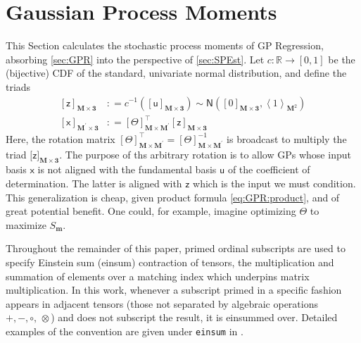 \documentclass[preprint,12pt]{elsarticle}
\newcommand*{\M}[1]{\ensuremath{#1}\xspace}
\newcommand*{\x}{\times}
\newcommand*{\mi}[1]{\mathbf{#1}}
\newcommand*{\st}[1]{\mathbb{#1}}
\newcommand*{\rv}[1]{\mathsf{#1}}
\newcommand*{\te}[2][]{\left\lbrack{#2}\right\rbrack_{#1}}
\newcommand*{\tte}[2][]{\lbrack{#2}\rbrack_{#1}}
\newcommand*{\diag}[2][]{\left\langle{#2}\right\rangle_{#1}}
\newcommand*{\deq}{\M{\mathrel{\mathop:}=}}
\newcommand*{\gauss}[2]{\mathsf{N}\!\left({#1,#2}\right)}
\begin{document}
\section{Gaussian Process Moments}\label{sec:GPMom}
    This Section calculates the stochastic process moments of GP Regression, absorbing \cref{sec:GPR} into the perspective of \cref{sec:SPEst}.
    Let $c\colon \st{R} \to [0,1]$ be the (bijective) CDF of the standard, univariate normal distribution, and define the triads
    \begin{equation*}
        \begin{aligned}
            \te[\mi{M\x 3}]{\rv{z}} &\deq c^{-1}\!\left(\te[\mi{M\x 3}]
            {\rv{u}}\right) \sim \gauss{\te[\mi{M\x 3}]{0}}{\diag[\mi{M}^{2}]{1}} \\
            \te[\mi{M^{\prime}\x 3}]{\rv{x}} &\deq \te[\mi{M\x M^{\prime}}]{\Theta}^{\intercal} \te[\mi{M\x 3}]{\rv{z}}
        \end{aligned}
    \end{equation*}
    Here, the rotation matrix $\te[\mi{M\x M^{\prime}}]{\Theta}^{\intercal} = \te[\mi{M\x M^{\prime}}]{\Theta}^{-1}$ is broadcast to multiply the triad $\tte[\mi{M\x 3}]{\rv{z}}$. 
    The purpose of ths arbitrary rotation is to allow GPs whose input basis $\rv{x}$ is not aligned with the fundamental basis $\rv{u}$ of the coefficient of determination. The latter is aligned with $\rv{z}$ which is the input we must condition. This generalization is cheap, given product formula \cref{eq:GPR:product}, and of great potential benefit. One could, for example, imagine optimizing $\Theta$ to maximize $S_{\mi{m}}$.
    
    Throughout the remainder of this paper, primed ordinal subscripts are used to specify Einstein sum (einsum) contraction of tensors, the multiplication and summation of elements over a matching index which underpins matrix multiplication. In this work, whenever a subscript primed in a specific fashion appears in adjacent tensors (those not separated by algebraic operations $+,-,\circ,\,\otimes$) and does not subscript the result, it is einsummed over. Detailed examples of the convention are given under {\tt einsum} in \cite{Numpy2022}.
    
\end{document}
